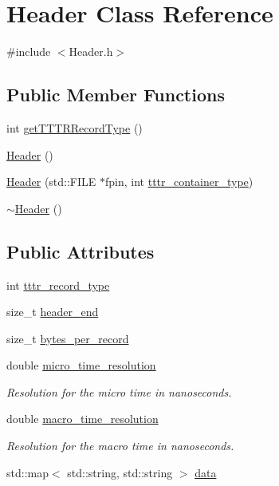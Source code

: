 \hypertarget{class_header}{}\section{Header Class Reference}
\label{class_header}


{\ttfamily \#include $<$Header.\+h$>$}

\subsection*{Public Member Functions}
\begin{DoxyCompactItemize}
\item 
int \hyperlink{class_header_ac51d948dc51841e8b593aa80ccee8d8d}{get\+T\+T\+T\+R\+Record\+Type} ()
\item 
\hyperlink{class_header_ab20eba80063f6fa6a74c474f09bca886}{Header} ()
\item 
\hyperlink{class_header_aaf076044ca6c1f5b22777b5d390001e5}{Header} (std\+::\+F\+I\+LE $\ast$fpin, int \hyperlink{class_header_a67518ee8258bc7004cd4f375fbc10623}{tttr\+\_\+container\+\_\+type})
\item 
\hyperlink{class_header_a035f03005e0534c058d61c04fa5e3c9e}{$\sim$\+Header} ()
\end{DoxyCompactItemize}
\subsection*{Public Attributes}
\begin{DoxyCompactItemize}
\item 
int \hyperlink{class_header_a1bb0274b16efc366c616612c95d23f09}{tttr\+\_\+record\+\_\+type}
\item 
size\+\_\+t \hyperlink{class_header_a8eb66d0a52e07e3176173ea9fc8f4aa2}{header\+\_\+end}
\item 
size\+\_\+t \hyperlink{class_header_aa56d9a3159e45e4baa326b6b360e2c2d}{bytes\+\_\+per\+\_\+record}
\item 
double \hyperlink{class_header_a8fa62f3387498cc02299aa4b469b61c8}{micro\+\_\+time\+\_\+resolution}
\begin{DoxyCompactList}\small\item\em Resolution for the micro time in nanoseconds. \end{DoxyCompactList}\item 
double \hyperlink{class_header_ab35b96124528a2a4970f9a091eaea1e0}{macro\+\_\+time\+\_\+resolution}
\begin{DoxyCompactList}\small\item\em Resolution for the macro time in nanoseconds. \end{DoxyCompactList}\item 
std\+::map$<$ std\+::string, std\+::string $>$ \hyperlink{class_header_a4a13dbd471798b9dcc7eba5a8ffcfd98}{data}
\end{DoxyCompactItemize}
